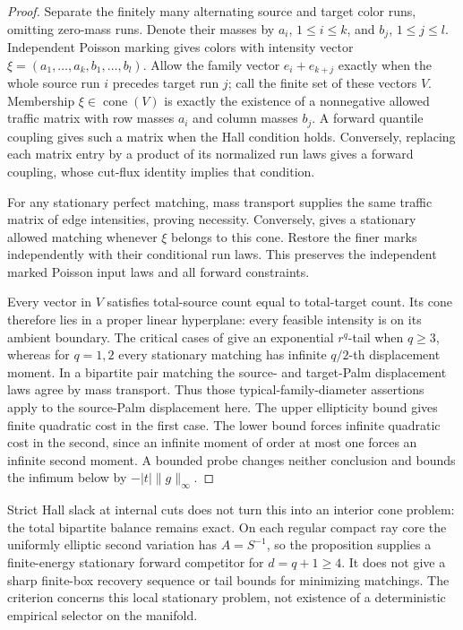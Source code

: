 \documentclass[11pt,reqno]{amsart}
\theoremstyle{definition}
\theoremstyle{remark}
\numberwithin{equation}{section}
\begin{document}
\begin{proof}
Separate the finitely many alternating source and target color runs,
omitting zero-mass runs. Denote their masses by \(a_i\), \(1\le i\le k\),
and \(b_j\), \(1\le j\le l\). Independent Poisson marking gives colors
with intensity vector \(\xi=(a_1,\ldots,a_k,b_1,\ldots,b_l)\).
Allow the family vector \(e_i+e_{k+j}\) exactly when the whole source
run \(i\) precedes target run \(j\); call the finite set of these
vectors \(V\). Membership \(\xi\in\operatorname{cone}(V)\) is exactly
the existence of a nonnegative allowed traffic matrix with row masses
\(a_i\) and column masses \(b_j\). A forward quantile coupling gives
such a matrix when the Hall condition holds. Conversely, replacing
each matrix entry by a product of its normalized run laws gives a
forward coupling, whose cut-flux identity implies that condition.

For any stationary perfect matching, mass transport supplies the same
traffic matrix of edge intensities, proving necessity. Conversely,
\cite[Theorem~1]{AmirAngelHolroyd} gives a stationary allowed matching
whenever \(\xi\) belongs to this cone. Restore the finer marks
independently with their conditional run laws. This preserves the
independent marked Poisson input laws and all forward constraints.

Every vector in \(V\) satisfies total-source count equal to total-target
count. Its cone therefore lies in a proper linear hyperplane: every
feasible intensity is on its ambient boundary. The critical cases of
\cite[Theorem~1(ii),(iii)]{AmirAngelHolroyd} give an exponential
\(r^q\)-tail when \(q\ge3\), whereas for \(q=1,2\) every stationary
matching has infinite \(q/2\)-th displacement moment. In a bipartite
pair matching the source- and target-Palm displacement laws agree by
mass transport. Thus those typical-family-diameter assertions apply
to the source-Palm displacement here. The upper ellipticity bound
gives finite quadratic cost in the first case. The lower bound forces
infinite quadratic cost in the second, since an infinite moment of
order at most one forces an infinite second moment. A bounded probe
changes neither conclusion and bounds the infimum below by
\(-|t|\|g\|_\infty\).
\end{proof}

Strict Hall slack at internal cuts does not turn this into an interior
cone problem: the total bipartite balance remains exact. On each
regular compact ray core the uniformly elliptic second variation has
\(A=S^{-1}\), so the proposition supplies a finite-energy stationary
forward competitor for \(d=q+1\ge4\). It does not give a sharp
finite-box recovery sequence or tail bounds for minimizing matchings.
The criterion concerns this local stationary problem, not existence
of a deterministic empirical selector on the manifold.
\end{document}
